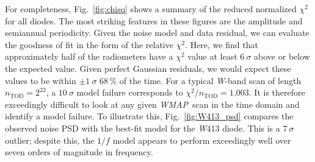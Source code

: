 \documentclass[twocolumn]{../../common/aa}
\def\WMAP{\emph{WMAP}}
\newcommand{\W}[0]{\textit W}
\begin{document}
For completeness, Fig.~\ref{fig:chisq} shows a summary of the reduced
normalized $\chi^2$ for all diodes. The most striking features in
these figures are the amplitude and semiannual periodicity.  Given
the noise model and data residual, we can evaluate the goodness of fit
in the form of the relative $\chi^2$. Here, we find that approximately
half of the radiometers have a $\chi^2$ value at least $6~\sigma$ above
or below the expected value.  Given perfect Gaussian residuals, we
would expect these values to be within $\pm1~\sigma$ 68\,\% of the time. For
a typical \W-band scan of length $n_\mathrm{TOD}=2^{22}$, a $10~\sigma$
model failure corresponds to $\chi^2/n_\mathrm{TOD}=1.003$. It is
therefore exceedingly difficult to look at any given \WMAP\ scan in
the time domain and identify a model failure. To illustrate this,
Fig.~\ref{fig:W413_psd} compares the observed noise PSD with the
best-fit model for the \W413 diode. This is a $7~\sigma$ outlier;
despite this, the $1/f$ model appears to perform exceedingly well over
seven orders of magnitude in frequency.
\end{document}
